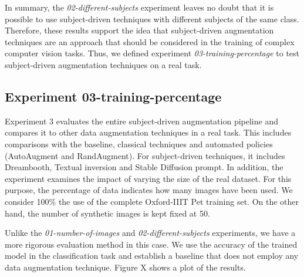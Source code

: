 In summary, the \textit{02-different-subjects} experiment leaves no doubt that it is possible to use subject-driven techniques with different subjects of the same class. Therefore, these results support the idea that subject-driven augmentation techniques are an approach that should be considered in the training of complex computer vision tasks. Thus, we defined experiment \textit{03-training-percentage} to test subject-driven augmentation techniques on a real task.

\subsection{Experiment 03-training-percentage} \label{sec: exp-03}

Experiment 3 evaluates the entire subject-driven augmentation pipeline and compares it to other data augmentation techniques in a real task. This includes comparisons with the baseline, classical techniques and automated policies (AutoAugment and RandAugment). For subject-driven techniques, it includes Dreambooth, Textual inversion and Stable Diffusion prompt. In addition, the experiment examines the impact of varying the size of the real dataset. For this purpose, the percentage of data indicates how many images have been used. We consider 100\% the use of the complete Oxford-IIIT Pet training set. On the other hand, the number of synthetic images is kept fixed at 50.

Unlike the \textit{01-number-of-images} and \textit{02-different-subjects} experiments, we have a more rigorous evaluation method in this case. We use the accuracy of the trained model in the classification task and establish a baseline that does not employ any data augmentation technique. Figure X shows a plot of the results. 

